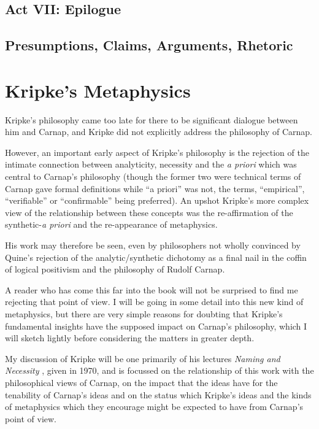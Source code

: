 \section{Act VII: Epilogue}

\section{Presumptions, Claims, Arguments, Rhetoric}

\chapter{Kripke's Metaphysics}

Kripke's philosophy came too late for there to be significant dialogue
between him and Carnap, and Kripke did not explicitly address the
philosophy of Carnap.

However, an important early aspect of Kripke's philosophy is the rejection
of the intimate connection between analyticity, necessity and the \emph{a priori}
which was central to Carnap's philosophy (though the former two were
technical terms of Carnap gave formal definitions while ``a priori'' was
not, the terms, ``empirical'', ``verifiable'' or ``confirmable'' being preferred).
An upshot Kripke's more complex view of the relationship between these concepts
was the re-affirmation of the synthetic-\emph{a priori} and the re-appearance of
metaphysics.

His work may therefore be seen, even by philosophers not wholly convinced
by Quine's rejection of the analytic/synthetic dichotomy as a final nail
in the coffin of logical positivism and the philosophy of Rudolf Carnap.

A reader who has come this far into the book will not be surprised to find
me rejecting that point of view.
I will be going in some detail into this new kind of metaphysics, but there
are very simple reasons for doubting that Kripke's fundamental insights have
the supposed impact on Carnap's philosophy, which I will sketch lightly
before considering the matters in greater depth.

My discussion of Kripke will be one primarily of his lectures
\emph{Naming and Necessity} \cite{kripke72}, given in 1970, and is focussed
on the relationship of this work with the philosophical views of Carnap, on
the impact that the ideas have for the tenability of Carnap's ideas
and on the status which Kripke's ideas and the kinds of metaphysics which
they encourage might be expected to have from Carnap's point of view.


